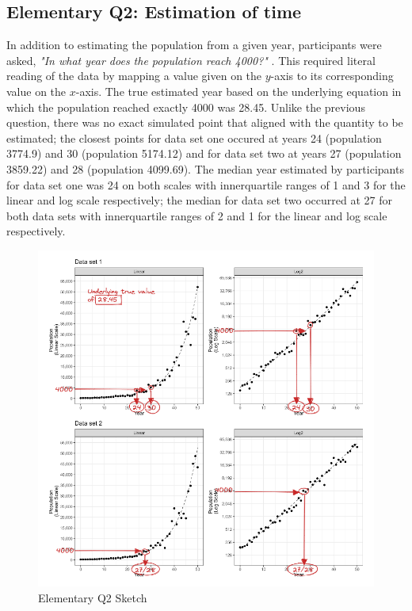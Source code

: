 \documentclass[print]{nuthesis}
\begin{document}
\hypertarget{elementary-q2-estimation-of-time}{%
\subsection{Elementary Q2: Estimation of time}\label{elementary-q2-estimation-of-time}}

In addition to estimating the population from a given year, participants were asked, \textit{"In what year does the population reach 4000?"} .
This required literal reading of the data by mapping a value given on the \(y\)-axis to its corresponding value on the \(x\)-axis.
The true estimated year based on the underlying equation in which the population reached exactly 4000 was 28.45.
Unlike the previous question, there was no exact simulated point that aligned with the quantity to be estimated; the closest points for data set one occured at years 24 (population 3774.9) and 30 (population 5174.12) and for data set two at years 27 (population 3859.22) and 28 (population 4099.69).
The median year estimated by participants for data set one was 24 on both scales with innerquartile ranges of 1 and 3 for the linear and log scale respectively; the median for data set two occurred at 27 for both data sets with innerquartile ranges of 2 and 1 for the linear and log scale respectively.

\begin{figure}[tbp]

{\centering \includegraphics[width=1\linewidth,]{images/03-estimation/qe2-sketch} 

}

\caption{Elementary Q2 Sketch}\label{fig:qe2-sketch}
\end{figure}
\end{document}
